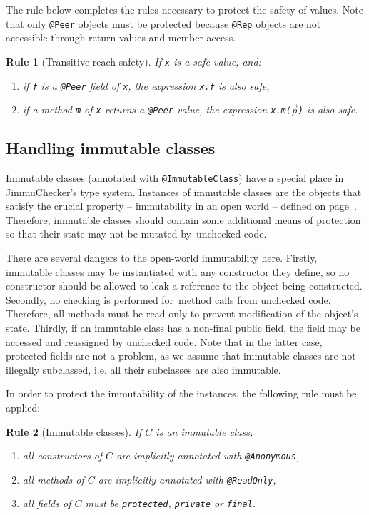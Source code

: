 \documentclass{pracamgr}
\theoremstyle{break}
\theoremstyle{break}
\theoremstyle{break}
\newtheorem{verrule}{Rule}
\begin{document}
The rule below completes the rules necessary to protect the safety of
values. Note that only \texttt{@Peer} objects must be protected
because \texttt{@Rep} objects are not accessible through return values
and member access.
\begin{verrule}[Transitive reach safety]
  If \texttt{x} is a safe value, and:
  \begin{enumerate}[label=(\arabic*)]
  \item if \texttt{f} is a \texttt{@Peer} field of \texttt{x}, the
    expression \texttt{x.f} is also safe, 
  \item if a method \texttt{m} of \texttt{x} returns a \texttt{@Peer}
    value, the expression \texttt{x.m($\vec{p}$)} is also safe. 
  \end{enumerate}
\end{verrule}

\subsection{Handling immutable classes}

Immutable classes (annotated with \texttt{@ImmutableClass}) have a
special place in JimmuChecker's type system. Instances of immutable
classes are the objects that satisfy the crucial property --
immutability in an open world -- defined on
page~\pageref{inv:open}. Therefore, immutable classes should contain
some additional means of protection so that their state may not be
mutated by~unchecked code.

There are several dangers to the open-world immutability
here. Firstly, immutable classes may be instantiated with any
constructor they define, so no constructor should be allowed to leak a
reference to the object being constructed. Secondly, no checking is
performed for~method calls from unchecked code. Therefore, all methods
must be read-only to prevent modification of the object's
state. Thirdly, if an immutable class has a non-final public field,
the field may be accessed and reassigned by unchecked code. Note that
in the latter case, protected fields are not a problem, as we assume
that immutable classes are not illegally subclassed, i.e. all their
subclasses are also immutable.

In order to protect the immutability of the instances, the following
rule must be applied:
\begin{verrule}[Immutable classes]
  If $C$ is an immutable class, 
  \begin{enumerate}[label=(\arabic*)]
  \item all constructors of $C$ are implicitly annotated with \texttt{@Anonymous},
  \item all methods of $C$ are implicitly annotated with \texttt{@ReadOnly},  
  \item all fields of $C$ must be \texttt{protected}, \texttt{private} or \texttt{final}.
  \end{enumerate}
\end{verrule}
\end{document}
